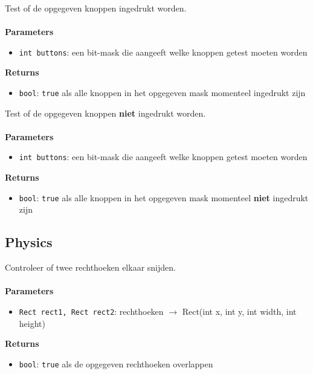 \documentclass[11pt,fleqn]{book} %
\begin{document}
\begin{libf}
	Test of de opgegeven knoppen ingedrukt worden.\\ \\
	\textbf{Parameters}
	\begin{itemize}
		\item \texttt{int buttons}: een bit-mask die aangeeft welke knoppen getest moeten worden 
	\end{itemize}
	\textbf{Returns}
	\begin{itemize}
		\item \texttt{bool}: \texttt{true} als alle knoppen in het opgegeven mask momenteel ingedrukt zijn
	\end{itemize}
\end{libf}

\begin{libf}
	Test of de opgegeven knoppen \textbf{niet} ingedrukt worden.\\ \\
	\textbf{Parameters}
	\begin{itemize}
		\item \texttt{int buttons}: een bit-mask die aangeeft welke knoppen getest moeten worden
	\end{itemize}
	\textbf{Returns}
	\begin{itemize}
		\item \texttt{bool}: \texttt{true} als alle knoppen in het opgegeven mask momenteel \textbf{niet} ingedrukt zijn
	\end{itemize}
\end{libf}

\subsection{Physics}

\begin{libf}
	Controleer of twee rechthoeken elkaar snijden.\\ \\
	\textbf{Parameters}	
	\begin{itemize}
		\item \texttt{Rect rect1, Rect rect2}: rechthoeken $\rightarrow$ Rect(int x, int y, int width, int height)
	\end{itemize}
	\textbf{Returns}
	\begin{itemize}
		\item \texttt{bool}: \texttt{true} als de opgegeven rechthoeken overlappen
	\end{itemize}
\end{libf}
\end{document}
